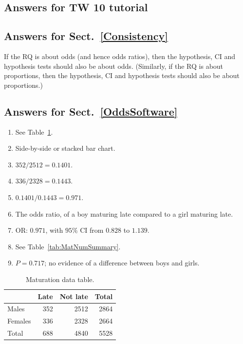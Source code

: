 \documentclass[
  11pt,
  a4paper,
  krantz2]{krantz}
\providecommand{\tightlist}{%
  \setlength{\itemsep}{0pt}\setlength{\parskip}{0pt}}
\begin{document}
\begin{footnotesize}
\section{Answers for TW 10 tutorial}\label{Lecture10Answers}

\subsection*{Answers for Sect.~\ref{Consistency}}\label{answers-for-sect.-refconsistency}

If the RQ is about odds (and hence odds ratios), then the hypothesis, CI and hypothesis tests should also be about odds.
(Similarly, if the RQ is about proportions, then the hypothesis, CI and hypothesis tests should also be about proportions.)

\subsection*{Answers for Sect.~\ref{OddsSoftware}}\label{answers-for-sect.-refoddssoftware}

\begin{enumerate}
\def\labelenumi{\arabic{enumi}.}
\tightlist
\item
  See Table~\ref{tab:MatTable}.
\item
  Side-by-side or stacked bar chart.
\item
  \(352/2512 = 0.1401\).
\item
  \(336/2328 = 0.1443\).
\item
  \(0.1401/0.1443 = 0.971\).
\item
  The odds ratio, of a boy maturing late compared to a girl maturing late.
\item
  OR: \(0.971\), with \(95\)\% CI from \(0.828\) to \(1.139\).
\item
  See Table~\ref{tab:MatNumSummary}.
\item
  \(P = 0.717\); no evidence of a difference between boys and girls.
\end{enumerate}

\begin{table}
\centering
\caption{\label{tab:MatTable}Maturation data table.}
\centering
\fontsize{8}{10}\selectfont
\begin{tabular}[t]{lrrr}
\toprule
\textbf{ } & \textbf{Late} & \textbf{Not late} & \textbf{Total}\\
\midrule
Males & 352 & 2512 & 2864\\
Females & 336 & 2328 & 2664\\
Total & 688 & 4840 & 5528\\
\bottomrule
\end{tabular}
\end{table}


\end{footnotesize}
\end{document}
